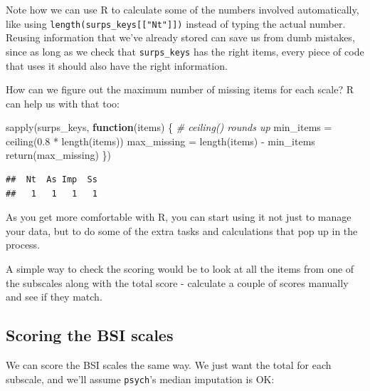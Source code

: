 \documentclass[
]{book}
\newenvironment{Shaded}{\begin{snugshade}}{\end{snugshade}}
\newcommand{\CommentTok}[1]{\textcolor[rgb]{0.56,0.35,0.01}{\textit{#1}}}
\newcommand{\ControlFlowTok}[1]{\textcolor[rgb]{0.13,0.29,0.53}{\textbf{#1}}}
\newcommand{\FloatTok}[1]{\textcolor[rgb]{0.00,0.00,0.81}{#1}}
\newcommand{\FunctionTok}[1]{\textcolor[rgb]{0.00,0.00,0.00}{#1}}
\newcommand{\NormalTok}[1]{#1}
\newcommand{\OtherTok}[1]{\textcolor[rgb]{0.56,0.35,0.01}{#1}}
\newcommand{\SpecialCharTok}[1]{\textcolor[rgb]{0.00,0.00,0.00}{#1}}
\begin{document}
Note how we can use R to calculate some of the numbers involved automatically,
like using \texttt{length(surps\_keys{[}{[}"Nt"{]}{]})} instead of typing the actual number.
Reusing information that we've already stored can save us from dumb mistakes,
since as long as we check that \texttt{surps\_keys} has the right items, every piece
of code that uses it should also have the right information.

How can we figure out the maximum number of missing items for each scale?
R can help us with that too:

\begin{Shaded}
\begin{Highlighting}[]
\FunctionTok{sapply}\NormalTok{(surps\_keys, }\ControlFlowTok{function}\NormalTok{(items) \{}
    \CommentTok{\# ceiling() rounds up}
\NormalTok{    min\_items }\OtherTok{=} \FunctionTok{ceiling}\NormalTok{(}\FloatTok{0.8} \SpecialCharTok{*} \FunctionTok{length}\NormalTok{(items))}
\NormalTok{    max\_missing }\OtherTok{=} \FunctionTok{length}\NormalTok{(items) }\SpecialCharTok{{-}}\NormalTok{ min\_items}
    \FunctionTok{return}\NormalTok{(max\_missing)}
\NormalTok{\})}
\end{Highlighting}
\end{Shaded}

\begin{verbatim}
##  Nt  As Imp  Ss 
##   1   1   1   1
\end{verbatim}

As you get more comfortable with R, you can start using it not just
to manage your data, but to do some of the extra tasks and calculations that
pop up in the process.

\begin{note}
A simple way to check the scoring would be to look at all the items from
one of the subscales along with the total score - calculate a couple of
scores manually and see if they match.
\end{note}

\hypertarget{scoring-the-bsi-scales}{%
\subsection{Scoring the BSI scales}\label{scoring-the-bsi-scales}}

We can score the BSI scales the same way. We just want the total
for each subscale, and we'll assume \texttt{psych}'s median imputation
is OK:
\end{document}
